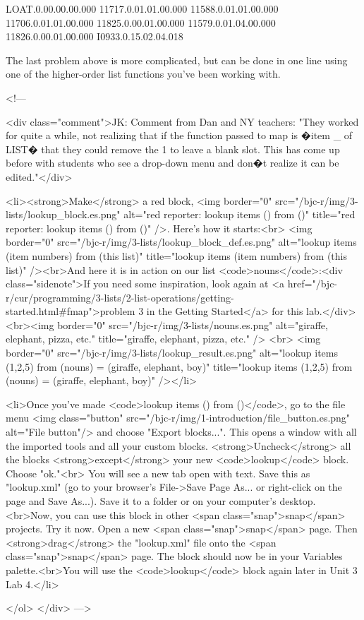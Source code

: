 LOAT.0.00.00.00.000
11717.0.01.01.00.000
11588.0.01.01.00.000
11706.0.01.01.00.000
11825.0.00.01.00.000
11579.0.01.04.00.000
11826.0.00.01.00.000
I0933.0.15.02.04.018




The last problem above is more complicated, but can be done in one line using one of the higher-order list functions you've been working with. 





<!---        

<div class="comment">JK: Comment from Dan and NY teachers: "They worked for quite a while, not realizing that if the function passed to map is �item _ of LIST� that they could remove the 1 to leave a blank slot.  This has come up before with students who see a drop-down menu and don�t realize it can be edited."</div>
        
        <li><strong>Make</strong> a red block, <img border="0" src="/bjc-r/img/3-lists/lookup_block.es.png" alt="red reporter: lookup items () from ()" title="red reporter: lookup items () from ()" />. Here's how it starts:<br> <img border="0" src="/bjc-r/img/3-lists/lookup_block_def.es.png" alt="lookup items (item numbers) from (this list)" title="lookup items (item numbers) from (this list)" /><br>And here it is in action on our list <code>nouns</code>:<div class="sidenote">If you need some inspiration, look again at <a href="/bjc-r/cur/programming/3-lists/2-list-operations/getting-started.html#fmap">problem 3 in the Getting Started</a> for this lab.</div><br><img border="0" src="/bjc-r/img/3-lists/nouns.es.png" alt="giraffe, elephant, pizza, etc." title="giraffe, elephant, pizza, etc." /> <br> <img border="0" src="/bjc-r/img/3-lists/lookup_result.es.png" alt="lookup items (1,2,5) from (nouns) = (giraffe, elephant, boy)" title="lookup items (1,2,5) from (nouns) = (giraffe, elephant, boy)" /></li>
        

 
        
        
        
        
        
        
        
        
                
        <li>Once you've made <code>lookup items () from ()</code>, go to the file menu <img class="button" src="/bjc-r/img/1-introduction/file_button.es.png" alt="File button"/> and choose "Export blocks...". This opens a window with all the imported tools and all your custom blocks. <strong>Uncheck</strong> all the blocks <strong>except</strong> your new <code>lookup</code> block. Choose "ok."<br> You will see a new tab open with text. Save this as "lookup.xml" (go to your browser's File->Save Page As... or right-click on the page and Save As...). Save it to a folder or on your computer's desktop.<br>Now, you can use this block in other <span class="snap">snap</span> projects. Try it now. Open a new <span class="snap">snap</span> page. Then <strong>drag</strong> the "lookup.xml" file onto the <span class="snap">snap</span> page. The block should now be in your Variables palette.<br>You will use the <code>lookup</code> block again later in Unit 3 Lab 4.</li>
        
    </ol>
    </div>
--->